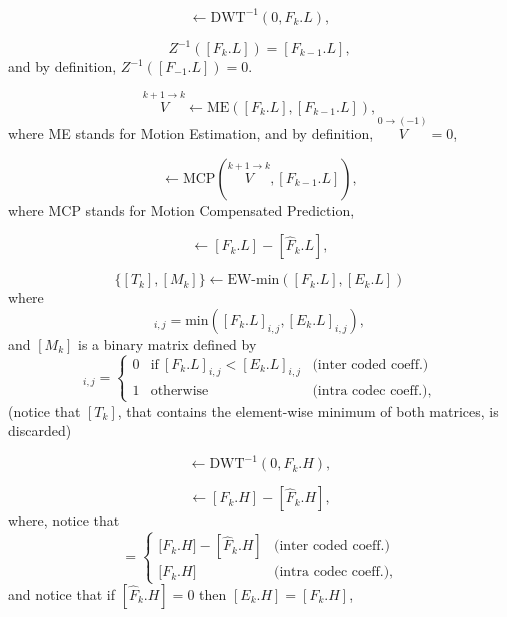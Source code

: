 \begin{equation}
  [F_k.L] \leftarrow \text{DWT}^{-1}(0, F_k.L),
  \tag{b}
\end{equation}

\begin{equation}
  Z^{-1}([F_k.L]) = [F_{k-1}.L],
  \tag{c}
\end{equation}
and by definition, $Z^{-1}([F_{-1}.L]) = 0$.

\begin{equation}
  \overset{k+1\rightarrow k}{V} \leftarrow \text{ME}([F_k.L], [F_{k-1}.L]),
  \tag{d}
\end{equation}
where ME stands for Motion Estimation, and by definition,
$\overset{0\rightarrow (-1)}{V}=0$,

\begin{equation}
  [\hat{F}_k.L] \leftarrow \text{MCP}(\overset{k+1\rightarrow k}{V}, [F_{k-1}.L]),
  \tag{e}
\end{equation}
where MCP stands for Motion Compensated Prediction,

\begin{equation}
  [E_k.L] \leftarrow [F_k.L] - [\hat{F}_k.L],
  \tag{f}
\end{equation}

\begin{equation}
  \{[T_k],[M_k]\} \leftarrow \text{EW-min}([F_k.L], [E_k.L])
  \tag{g}
\end{equation}
where
\begin{equation}
  [T_k]_{i,j}=\text{min}([F_k.L]_{i,j}, [E_k.L]_{i,j}),
\end{equation}
and $[M_k]$ is a binary matrix defined by
\begin{equation}
  [M_k]_{i,j} = \left\{
  \begin{array}{lll}
    0 & \text{if}~[F_k.L]_{i,j} < [E_k.L]_{i,j} & \text{(inter coded coeff.)} \\
    1 & \text{otherwise} & \text{(intra codec coeff.)},
  \end{array}
  \right.
  \label{eq:matrix}
\end{equation}
(notice that $[T_k]$, that contains the element-wise minimum of both
matrices, is discarded)

\begin{equation}
  [F_k.H] \leftarrow \text{DWT}^{-1}(0, F_k.H),
  \tag{h}
\end{equation}

\begin{equation}
  [E_k.H] \leftarrow [F_k.H] - [\hat{F}_k.H],
  \tag{i}
\end{equation}
where, notice that
\begin{equation}
  [E_k.H] = \left\{
  \begin{array}{ll}
    {[}F_k.H{]} - [\hat{F}_k.H] & \text{(inter coded coeff.)} \\
    {[}F_k.H{]}                 & \text{(intra codec coeff.)},
  \end{array}
  \right.
\end{equation}
and notice that if $[\hat{F}_k.H]=0$ then $[E_k.H] = [F_k.H]$,

